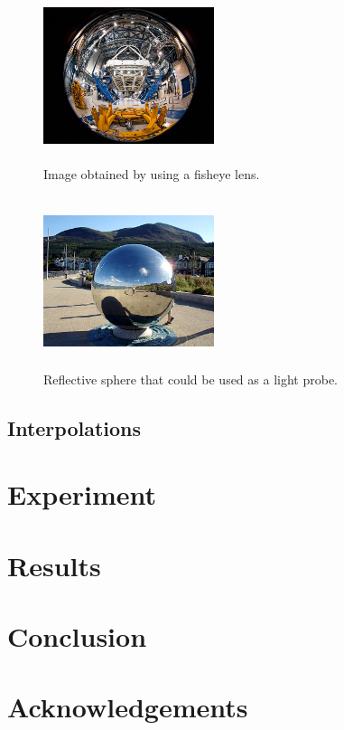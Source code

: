 \documentclass[conference]{acmsiggraph}
\begin{document}
		\begin{figure}[h!]
  			\caption{Image obtained by using a fisheye lens.}
 			 \centering
			\includegraphics[width=5cm, height=5cm]{images/fisheye.jpg}
		\end{figure}

		\begin{figure}[h!]
  			\caption{Reflective sphere that could be used as a light probe.}
 			 \centering
		\includegraphics[width=5cm, height=5cm]{images/lightprobe.jpg}
		\end{figure}


	\subsection{Interpolations}

\section{Experiment}

\section{Results}

\section{Conclusion}

\section*{Acknowledgements}



\end{document}
